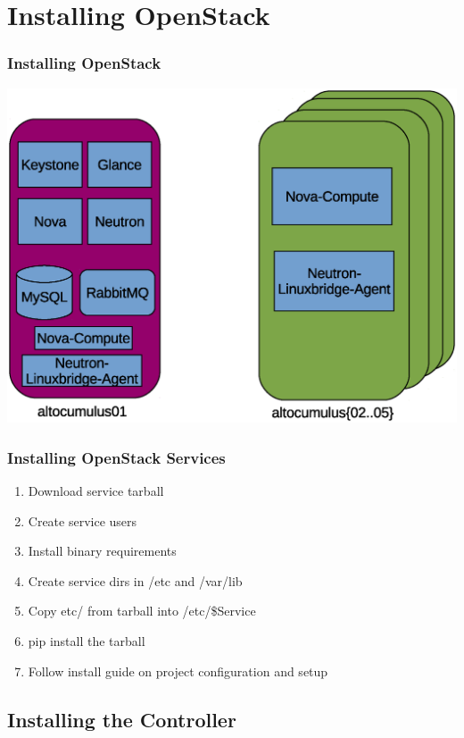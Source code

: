 \documentclass[aspectratio=169,11pt,hyperref={colorlinks=true}]{beamer}
\begin{document}
\section{Installing OpenStack}
\begin{frame}
    \frametitle{Installing OpenStack}
    \centering
    \includegraphics[width=.8\textwidth]{service-split.eps}
\end{frame}
\begin{frame}
    \frametitle{Installing OpenStack Services}
    \begin{enumerate}
        \item Download service tarball
        \item Create service users
        \item Install binary requirements
        \item Create service dirs in /etc and /var/lib
        \item Copy etc/ from tarball into /etc/\$Service
        \item pip install the tarball
        \item Follow install guide on project configuration and setup
    \end{enumerate}
\end{frame}

\subsection{Installing the Controller}
\end{document}
